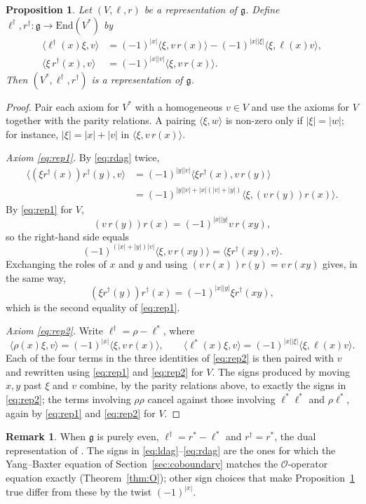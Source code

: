 \documentclass[11pt]{article}
\newtheorem{proposition}[theorem]{Proposition}
\theoremstyle{definition}
\newtheorem{remark}[theorem]{Remark}
\newcommand{\g}{\mathfrak{g}}
\newcommand{\End}{\mathrm{End}}
\newcommand{\lr}[1]{\langle #1\rangle}
\begin{document}
\begin{proposition}\label{prop:dual}
Let $(V,\ell,r)$ be a representation of $\g$. Define $\ell^\dagger,r^\dagger:\g\to\End(V^*)$ by
\begin{align}
\lr{\ell^\dagger(x)\xi,v}
&=(-1)^{|x|}\lr{\xi,v\,r(x)}
-(-1)^{|x||\xi|}\lr{\xi,\ell(x)v},\label{eq:ldag}\\
\lr{\xi\,r^\dagger(x),v}
&=(-1)^{|x||v|}\lr{\xi,v\,r(x)}.\label{eq:rdag}
\end{align}
Then $(V^*,\ell^\dagger,r^\dagger)$ is a representation of $\g$.
\end{proposition}
\begin{proof}
Pair each axiom for $V^*$ with a homogeneous $v\in V$ and use the axioms for $V$ together with the parity relations. A pairing $\lr{\xi,w}$ is non-zero only if $|\xi|=|w|$; for instance, $|\xi|=|x|+|v|$ in $\lr{\xi,v\,r(x)}$.

\emph{Axiom \eqref{eq:rep1}.}
By \eqref{eq:rdag} twice,
\[
\begin{aligned}
\lr{(\xi r^\dagger(x))r^\dagger(y),v}
&=(-1)^{|y||v|}\lr{\xi r^\dagger(x),v\,r(y)}\\
&=(-1)^{|y||v|+|x|(|v|+|y|)}\lr{\xi,(v\,r(y))r(x)}.
\end{aligned}
\]
By \eqref{eq:rep1} for $V$,
\[
(v\,r(y))r(x)=(-1)^{|x||y|}v\,r(xy),
\]
so the right-hand side equals
\[
(-1)^{(|x|+|y|)|v|}\lr{\xi,v\,r(xy)}
=\lr{\xi r^\dagger(xy),v}.
\]
Exchanging the roles of $x$ and $y$ and using $(v\,r(x))r(y)=v\,r(xy)$ gives, in the same way,
\[
(\xi r^\dagger(y))r^\dagger(x)=(-1)^{|x||y|}\xi r^\dagger(xy),
\]
which is the second equality of \eqref{eq:rep1}.

\emph{Axiom \eqref{eq:rep2}.}
Write $\ell^\dagger=\rho-\ell^*$, where
\[
\lr{\rho(x)\xi,v}=(-1)^{|x|}\lr{\xi,v\,r(x)},
\qquad
\lr{\ell^*(x)\xi,v}=(-1)^{|x||\xi|}\lr{\xi,\ell(x)v}.
\]
Each of the four terms in the three identities of \eqref{eq:rep2} is then paired with $v$ and rewritten using \eqref{eq:rep1} and \eqref{eq:rep2} for $V$. The signs produced by moving $x,y$ past $\xi$ and $v$ combine, by the parity relations above, to exactly the signs in \eqref{eq:rep2}; the terms involving $\rho\rho$ cancel against those involving $\ell^*\ell^*$ and $\rho\ell^*$, again by \eqref{eq:rep1} and \eqref{eq:rep2} for $V$.
\end{proof}

\begin{remark}\label{rem:dual}
When $\g$ is purely even, $\ell^\dagger=r^*-\ell^*$ and $r^\dagger=r^*$, the dual representation of \cite{Hou}. The signs in \eqref{eq:ldag}--\eqref{eq:rdag} are the ones for which the Yang--Baxter equation of Section~\ref{sec:coboundary} matches the $\mathcal O$-operator equation exactly (Theorem~\ref{thm:O}); other sign choices that make Proposition~\ref{prop:dual} true differ from these by the twist $(-1)^{|x|}$.
\end{remark}
\end{document}
